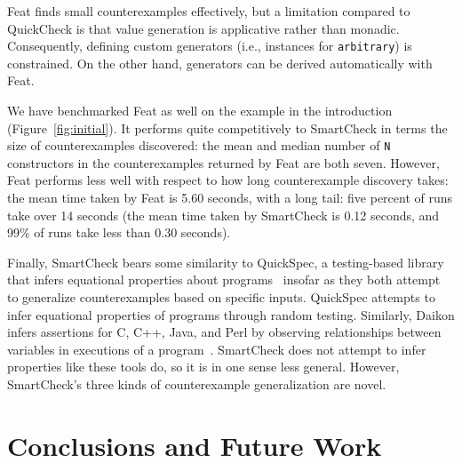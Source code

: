 \documentclass{sigplanconf}
\newcommand{\ttp}[1]{\texttt{#1}}
\begin{document}
Feat finds small counterexamples effectively, but a limitation compared to
QuickCheck is that value generation is applicative rather than monadic.
Consequently, defining custom generators (i.e., instances for \ttp{arbitrary})
is constrained.  On the other hand, generators can be derived
automatically with Feat.

We have benchmarked Feat as well on the example in the introduction
(Figure~\ref{fig:initial}).  It performs quite competitively to SmartCheck
in terms the size of counterexamples discovered: the mean and median number of
\ttp{N} constructors in the counterexamples returned by Feat are both seven. 
However, Feat performs less well with respect to how long counterexample
discovery takes: the mean time taken by Feat is 5.60 seconds, with a long tail:
five percent of runs take over 14 seconds (the mean time taken by
SmartCheck is 0.12 seconds, and 99\% of runs take less than 0.30 seconds).

Finally, SmartCheck bears some similarity to QuickSpec, a testing-based library
that infers equational properties about programs~\cite{qs} insofar as they both
attempt to generalize counterexamples based on specific inputs.  QuickSpec
attempts to infer equational properties of programs through random testing.
Similarly, Daikon infers assertions for C, C++, Java, and Perl by observing
relationships between variables in executions of a program~\cite{daikon}.
SmartCheck does not attempt to infer properties like these tools do, so it is in
one sense less general.  However, SmartCheck's three kinds of counterexample
generalization are novel.



\section{Conclusions and Future Work}\label{sec:conclusions}
\end{document}
